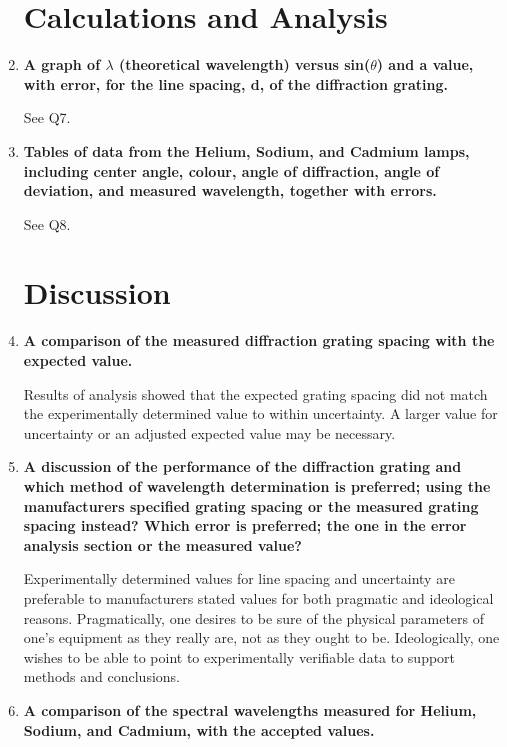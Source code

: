 \documentclass[justified]{tufte-book}
\begin{document}
\begin{enumerate}
\section{Calculations and Analysis}

\item {\bf A graph of $\lambda$ (theoretical wavelength) versus sin($\theta$) and a value, with error, for the line spacing, d, of the diffraction grating.}\newline

See Q7.

\item {\bf Tables of data from the Helium, Sodium, and Cadmium lamps, including center angle, colour, angle of diffraction, angle of deviation, and measured wavelength, together with errors.}\newline

See Q8.

\section{Discussion}

\item {\bf A comparison of the measured diffraction grating spacing with the expected value.}\newline

Results of analysis showed that the expected grating spacing did not match the experimentally determined value to within uncertainty. A larger value for uncertainty or an adjusted expected value may be necessary.

\item {\bf A discussion of the performance of the diffraction grating and which method of wavelength determination is preferred; using the manufacturers specified grating spacing or the measured grating spacing instead? Which error is preferred; the one in the error analysis section or the measured value?}\newline

Experimentally determined values for line spacing and uncertainty are preferable to manufacturers stated values for both pragmatic and ideological reasons. Pragmatically, one desires to be sure of the physical parameters of one's equipment as they really are, not as they ought to be. Ideologically, one wishes to be able to point to experimentally verifiable data to support methods and conclusions.

\item {\bf A comparison of the spectral wavelengths measured for Helium, Sodium, and Cadmium, with the accepted values.}\newline


\end{enumerate}
\end{document}
